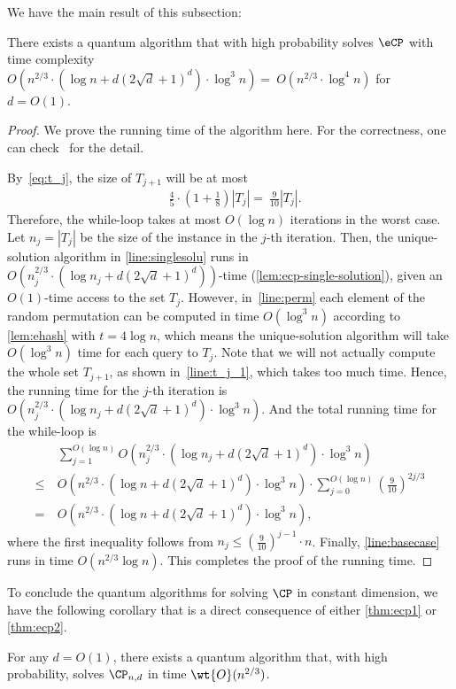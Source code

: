 We have the main result of this subsection:
\begin{theorem}
  \label{thm:ecp2}
  There exists a quantum algorithm that with high probability solves $\eCP$ with time complexity $O(n^{2/3}\cdot (\log n + d(2\sqrt{d}+1)^d)\cdot \log^3 n)=~O(n^{2/3}\cdot \log^4 n)$ for $d=O(1)$.
\end{theorem}
\begin{proof}
We prove the running time of the algorithm here. For the correctness, one can check~\cite{r5} for the detail.

By~\cref{eq:t_j}, the size of $T_{j+1}$ will be at most 
\begin{align}
    &\frac{4}{5} \cdot (1+\frac{1}{8}) |T_j| =~ \frac{9}{10}|T_j|. 
\end{align}
Therefore, the while-loop takes at most $O(\log n)$ iterations in the worst case. Let $n_j=|T_j|$ be the size of the instance in the $j$-th iteration. Then, the unique-solution algorithm in \cref{line:singlesolu} runs in $O(n_j^{2/3}\cdot (\log n_j + d(2\sqrt{d}+1)^d))$-time (\cref{lem:ecp-single-solution}), given an $O(1)$-time access to the set $T_j$. However, in~\cref{line:perm} each element of the random permutation can be computed in time $O(\log^3 n)$ according to \cref{lem:ehash} with $t = 4\log n$, which means the unique-solution algorithm will take $O(\log^3 n)$ time for each query to $T_j$. Note that we will not actually compute the whole set $T_{j+1}$, as shown in~\cref{line:t_j_1}, which takes too much time. 
Hence, the running time for the $j$-th iteration is $O(n_j^{2/3}\cdot (\log n_j + d(2\sqrt{d}+1)^d)\cdot \log^3 n)$. And the total running time for the while-loop is
\begin{align}
    &~\sum_{j=1}^{O(\log n)} O(n_j^{2/3}\cdot (\log n_j + d(2\sqrt{d}+1)^d)\cdot \log^3 n)\\
    \leq &~ O(n^{2/3}\cdot (\log n + d(2\sqrt{d}+1)^d)\cdot \log^3 n)\cdot \sum_{j=0}^{O(\log n)} \left(\frac{9}{10}\right)^{2j/3}\\
    = &~ O(n^{2/3}\cdot (\log n + d(2\sqrt{d}+1)^d)\cdot \log^3 n),
\end{align}
where the first inequality follows from $n_j\leq (\frac{9}{10})^{j-1}\cdot n$.
Finally, \cref{line:basecase} runs in time $O(n^{2/3}\log n)$. This completes the proof of the running time.  
\end{proof}

To conclude the quantum algorithms for solving $\CP$ in constant dimension, we have the following corollary that is a direct consequence of either \cref{thm:ecp1} or \cref{thm:ecp2}.
\begin{corollary}\label{cor:main_cp}
  For any $d=O(1)$, there exists a quantum algorithm that, with high probability, solves $\CP_{n,d}$ in time $\wt{O}(n^{2/3})$.
\end{corollary}

